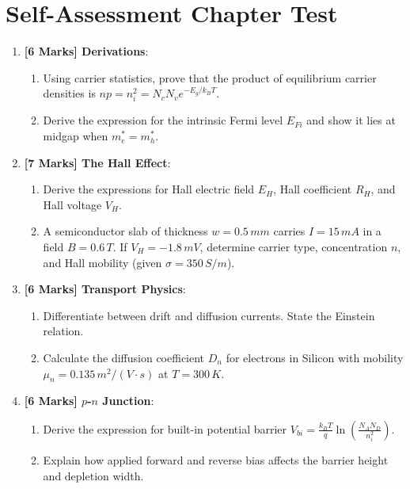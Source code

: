 \section{Self-Assessment Chapter Test}

\begin{chaptertest}
\begin{enumerate}
    \item \textbf{[6 Marks] Derivations}:
    \begin{enumerate}
        \item Using carrier statistics, prove that the product of equilibrium carrier densities is $n p = n_i^2 = N_c N_v e^{-E_g / k_B T}$.
        \item Derive the expression for the intrinsic Fermi level $E_{Fi}$ and show it lies at midgap when $m_e^* = m_h^*$.
    \end{enumerate}
    
    \item \textbf{[7 Marks] The Hall Effect}:
    \begin{enumerate}
        \item Derive the expressions for Hall electric field $E_H$, Hall coefficient $R_H$, and Hall voltage $V_H$.
        \item A semiconductor slab of thickness $w = 0.5\,\si{mm}$ carries $I = 15\,\si{mA}$ in a field $B = 0.6\,\si{T}$. If $V_H = -1.8\,\si{mV}$, determine carrier type, concentration $n$, and Hall mobility (given $\sigma = 350\,\si{S/m}$).
    \end{enumerate}
    
    \item \textbf{[6 Marks] Transport Physics}:
    \begin{enumerate}
        \item Differentiate between drift and diffusion currents. State the Einstein relation.
        \item Calculate the diffusion coefficient $D_n$ for electrons in Silicon with mobility $\mu_n = 0.135\,\si{m^2/(V\cdot s)}$ at $T = 300\,\si{K}$.
    \end{enumerate}
    
    \item \textbf{[6 Marks] $p$-$n$ Junction}:
    \begin{enumerate}
        \item Derive the expression for built-in potential barrier $V_{bi} = \frac{k_B T}{q}\ln\left(\frac{N_A N_D}{n_i^2}\right)$.
        \item Explain how applied forward and reverse bias affects the barrier height and depletion width.
    \end{enumerate}
\end{enumerate}
\end{chaptertest}

